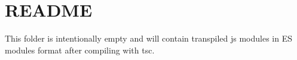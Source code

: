 \chapter{README}
\hypertarget{md_flatbuffers_2mjs_2README}{}\label{md_flatbuffers_2mjs_2README}
This folder is intentionally empty and will contain transpiled js modules in ES modules format after compiling with tsc. 